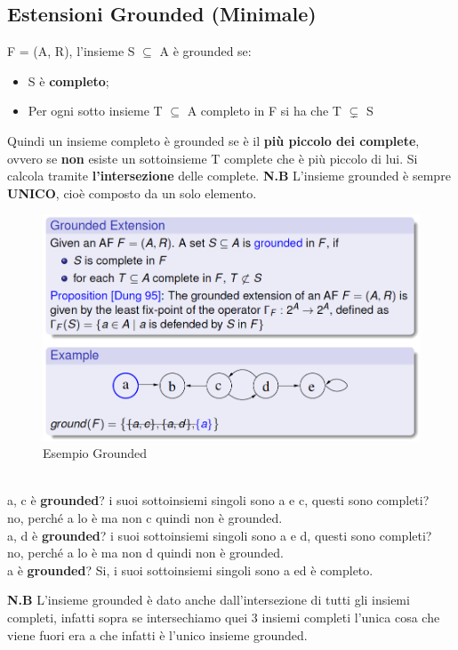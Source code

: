 \subsection{Estensioni Grounded (Minimale)}
F = (A, R), l'insieme S $\subseteq$ A è grounded se:
\begin{itemize}
    \item S è \textbf{completo};
    \item Per ogni sotto insieme T $\subseteq$ A completo in F si ha che T
          $\subsetneq$ S
\end{itemize}
Quindi un insieme completo è grounded se è il \textbf{più piccolo dei complete},
ovvero se \textbf{non} esiste un sottoinsieme T complete che è più piccolo di
lui. Si calcola tramite \textbf{l'intersezione} delle complete. \textbf{N.B}
L'insieme grounded è sempre \textbf{UNICO}, cioè composto da un solo elemento.
\begin{figure}[htp]
    \centering
    \includegraphics[width=12cm, keepaspectratio]{capitoli/img/Cap6/grounded.png}
    \caption{Esempio Grounded}
\end{figure}
\\a, c è \textbf{grounded}? i suoi sottoinsiemi singoli sono a e c, questi sono
completi? \\no, perché a lo è ma non c quindi non è grounded. \\a, d è
\textbf{grounded}? i suoi sottoinsiemi singoli sono a e d, questi sono completi?
\\no, perché a lo è ma non d quindi non è grounded. \\a è \textbf{grounded}? Si,
i suoi sottoinsiemi singoli sono a ed è completo.

\vspace{0.8cm}

\textbf{N.B} L'insieme grounded è dato anche dall'intersezione di tutti gli
insiemi completi, infatti sopra se intersechiamo quei 3 insiemi completi l'unica
cosa che viene fuori era a che infatti è l'unico insieme grounded.

